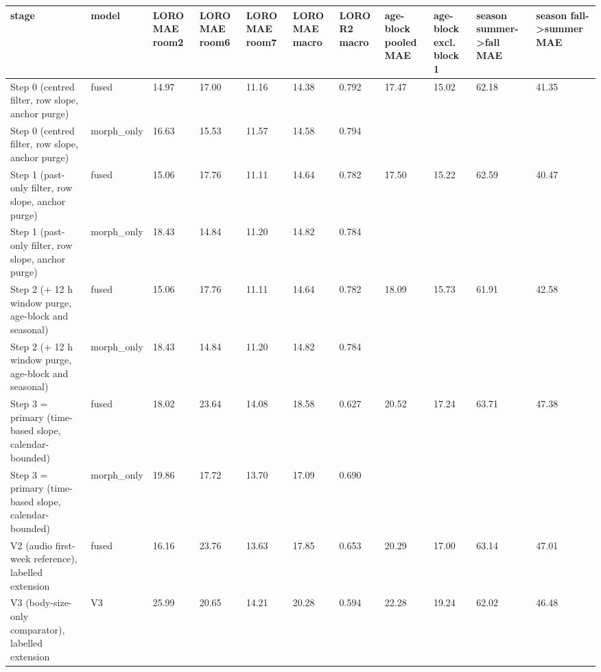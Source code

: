 \begin{tabular}{lllllllllll}
\hline
stage & model & LORO MAE room2 & LORO MAE room6 & LORO MAE room7 & LORO MAE macro & LORO R2 macro & age-block pooled MAE & age-block excl. block 1 & season summer->fall MAE & season fall->summer MAE \\
\hline
Step 0 (centred filter, row slope, anchor purge) & fused & 14.97 & 17.00 & 11.16 & 14.38 & 0.792 & 17.47 & 15.02 & 62.18 & 41.35 \\
Step 0 (centred filter, row slope, anchor purge) & morph\_only & 16.63 & 15.53 & 11.57 & 14.58 & 0.794 &  &  &  &  \\
Step 1 (past-only filter, row slope, anchor purge) & fused & 15.06 & 17.76 & 11.11 & 14.64 & 0.782 & 17.50 & 15.22 & 62.59 & 40.47 \\
Step 1 (past-only filter, row slope, anchor purge) & morph\_only & 18.43 & 14.84 & 11.20 & 14.82 & 0.784 &  &  &  &  \\
Step 2 (+ 12 h window purge, age-block and seasonal) & fused & 15.06 & 17.76 & 11.11 & 14.64 & 0.782 & 18.09 & 15.73 & 61.91 & 42.58 \\
Step 2 (+ 12 h window purge, age-block and seasonal) & morph\_only & 18.43 & 14.84 & 11.20 & 14.82 & 0.784 &  &  &  &  \\
Step 3 = primary (time-based slope, calendar-bounded) & fused & 18.02 & 23.64 & 14.08 & 18.58 & 0.627 & 20.52 & 17.24 & 63.71 & 47.38 \\
Step 3 = primary (time-based slope, calendar-bounded) & morph\_only & 19.86 & 17.72 & 13.70 & 17.09 & 0.690 &  &  &  &  \\
V2 (audio first-week reference), labelled extension & fused & 16.16 & 23.76 & 13.63 & 17.85 & 0.653 & 20.29 & 17.00 & 63.14 & 47.01 \\
V3 (body-size-only comparator), labelled extension & V3 & 25.99 & 20.65 & 14.21 & 20.28 & 0.594 & 22.28 & 19.24 & 62.02 & 46.48 \\
\hline
\end{tabular}

